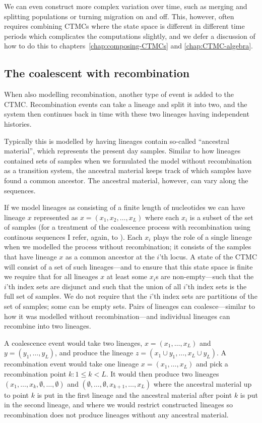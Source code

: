 We can even construct more complex variation over time, such as merging and splitting populations or turning migration on and off. This, however, often requires combining CTMCs where the state space is different in different time periods which complicates the computations slightly, and we defer a discussion of how to do this to chapters~\ref{chap:composing-CTMCs} and \ref{chap:CTMC-algebra}.


\subsection{The coalescent with recombination}

When also modelling recombination, another type of event is added to the CTMC. Recombination events can take a lineage and split it into two, and the system then continues back in time with these two lineages having independent histories.

Typically this is modelled by having lineages contain so-called ``ancestral material'', which represents the present day samples. Similar to how lineages contained sets of samples when we formulated the model without recombination as a transition system, the ancestral material keeps track of which samples have found a common ancestor. The ancestral material, however, can vary along the sequences.

If we model lineages as consisting of a finite length of nucleotides we can have lineage $x$ represented as $x=(x_1,x_2,\ldots,x_L)$ where each $x_i$ is a subset of the set of samples (for a treatment of the coalescence process with recombination using continous sequences I refer, again, to \citet{Hein:2005vz}). Each $x_i$ plays the role of a single lineage when we modelled the process without recombination; it consists of the samples that have lineage $x$ as a common ancestor at the $i$'th locus. A state of the CTMC will consist of a set of such lineages---and to ensure that this state space is finite we require that for all lineages $x$ at least some $x_i$s are non-empty---such that the $i$'th index sets are disjunct and such that the union of all $i$'th index sets is the full set of samples. We do not require that the $i$'th index sets are partitions of the set of samples; some can be empty sets. Pairs of lineages can coalesce---similar to how it was modelled without recombination---and individual lineages can recombine into two lineages.

A coalescence event would take two lineages, $x=(x_1,\ldots,x_L)$ and $y=(y_1,\ldots,y_L)$, and produce the lineage $z=(x_1\cup y_1,\ldots,x_L\cup y_L)$. A recombination event would take one lineage $x=(x_1,\ldots,x_L)$ and pick a recombination point $k: 1 \leq k < L$. It would then produce two lineages $(x_1,\ldots,x_k,\emptyset,\ldots,\emptyset)$ and $(\emptyset,\ldots,\emptyset,x_{k+1},\ldots,x_L)$ where the ancestral material up to point $k$ is put in the first lineage and the ancestral material after point $k$ is put in the second lineage, and where we would restrict constructed lineages so recombination does not produce lineages without any ancestral material.

